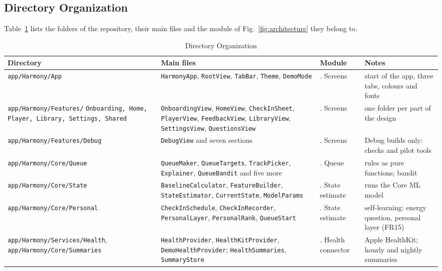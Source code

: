 \documentclass[conference]{IEEEtran}
\begin{document}
\subsection{Directory Organization}
Table~\ref{tab:dirs} lists the folders of the repository, their main files and the module of Fig.~\ref{fig:architecture} they belong to.

\begin{table}[!t]
\centering
\caption{Directory Organization}
\label{tab:dirs}
\scriptsize
\begin{tabularx}{\textwidth}{|>{\raggedright\arraybackslash}p{4.1cm}|>{\raggedright\arraybackslash}X|>{\raggedright\arraybackslash}p{2.1cm}|>{\raggedright\arraybackslash}p{3.4cm}|}
\hline
\textbf{Directory} & \textbf{Main files} & \textbf{Module} & \textbf{Notes} \\ \hline
\texttt{app/Harmony/App} & \texttt{HarmonyApp}, \texttt{RootView}, \texttt{TabBar}, \texttt{Theme}, \texttt{DemoMode} & 1. Screens & start of the app, three tabs, colours and fonts \\ \hline
\texttt{app/Harmony/Features/} \texttt{Onboarding, Home, Player, Library, Settings, Shared} & \texttt{OnboardingView}, \texttt{HomeView}, \texttt{CheckInSheet}, \texttt{PlayerView}, \texttt{FeedbackView}, \texttt{LibraryView}, \texttt{SettingsView}, \texttt{QuestionsView} & 1. Screens & one folder per part of the design \\ \hline
\texttt{app/Harmony/Features/Debug} & \texttt{DebugView} and seven sections & 1. Screens & Debug builds only: checks and pilot tools \\ \hline
\texttt{app/Harmony/Core/Queue} & \texttt{QueueMaker}, \texttt{QueueTargets}, \texttt{TrackPicker}, \texttt{Explainer}, \texttt{QueueBandit} and five more & 2. Queue & rules as pure functions; bandit \\ \hline
\texttt{app/Harmony/Core/State} & \texttt{BaselineCalculator}, \texttt{FeatureBuilder}, \texttt{StateEstimator}, \texttt{CurrentState}, \texttt{ModelParams} & 3. State estimate & runs the Core ML model \\ \hline
\texttt{app/Harmony/Core/Personal} & \texttt{CheckInSchedule}, \texttt{CheckInRecorder}, \texttt{PersonalLayer}, \texttt{PersonalRank}, \texttt{QueueStart} & 3. State estimate & self-learning: energy question, personal layer (FR15) \\ \hline
\texttt{app/Harmony/Services/Health}, \texttt{app/Harmony/Core/Summaries} & \texttt{HealthProvider}, \texttt{HealthKitProvider}, \texttt{DemoHealthProvider}; \texttt{HealthSummaries}, \texttt{SummaryStore} & 4. Health connector & Apple HealthKit; hourly and nightly summaries \\ \hline

\end{tabularx}
\end{table}
\end{document}
